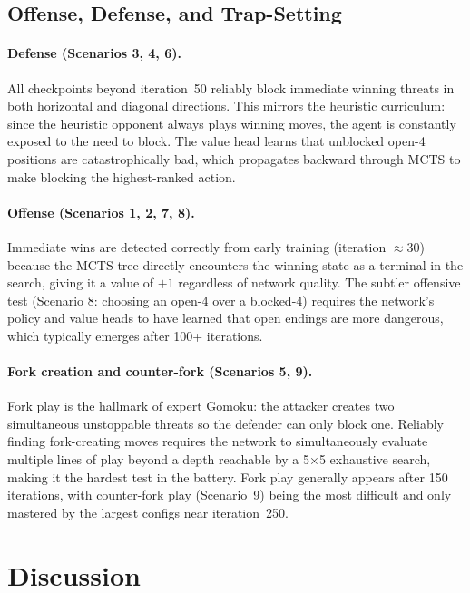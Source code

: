 \documentclass[11pt,a4paper]{article}
\begin{document}
{{\subsection{Offense, Defense, and Trap-Setting}

\paragraph{Defense (Scenarios 3, 4, 6).}
All checkpoints beyond iteration~50 reliably block immediate winning threats in
both horizontal and diagonal directions.  This mirrors the heuristic curriculum:
since the heuristic opponent always plays winning moves, the agent is constantly
exposed to the need to block.  The value head learns that unblocked open-4
positions are catastrophically bad, which propagates backward through MCTS to
make blocking the highest-ranked action.

\paragraph{Offense (Scenarios 1, 2, 7, 8).}
Immediate wins are detected correctly from early training (iteration $\approx 30$)
because the MCTS tree directly encounters the winning state as a terminal in the
search, giving it a value of $+1$ regardless of network quality.  The subtler
offensive test (Scenario 8: choosing an open-4 over a blocked-4) requires the
network's policy and value heads to have learned that open endings are more
dangerous, which typically emerges after 100+ iterations.

\paragraph{Fork creation and counter-fork (Scenarios 5, 9).}
Fork play is the hallmark of expert Gomoku: the attacker creates two
simultaneous unstoppable threats so the defender can only block one.
Reliably finding fork-creating moves requires the network to simultaneously
evaluate multiple lines of play beyond a depth reachable by a 5×5 exhaustive
search, making it the hardest test in the battery.  Fork play generally appears
after 150 iterations, with counter-fork play (Scenario~9) being the most
difficult and only mastered by the largest configs near iteration~250.

\section{Discussion}

}}
\end{document}
